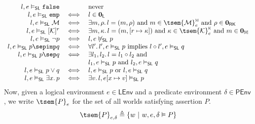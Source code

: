 \[
\begin{array}{r c l}
	l, e \vDash_\mathsf{SL} \mathtt{false}
	&&
	\text{never}
\\
	l, e \vDash_\mathsf{SL}  \mathtt{emp}
	&
	\iff
	&
	l \in \mathbf{0}_\mathsf{L}
\\
	l, e \vDash_\mathsf{SL} \mathcal{M}
	&
	\iff
	&
	\exists m, \rho \ldotp l = (m, \rho) \text{ and } m \in \tsem{\mathcal{M}}_e^\textsc{m} \text{ and } \rho \in \mathbf{0}_\mathsf{RK}
\\
	l, e \vDash_\mathsf{SL} [\mathcal{K}]^r
	&
	\iff
	&
	\exists m, \kappa \ldotp l = (m, [r \mapsto \kappa]) \text{ and } \kappa \in \tsem{\mathcal{K}}_e^\textsc{k} \text{ and } m \in \mathbf{0}_\mathbb{M}
\\
	l, e \vDash_\mathsf{SL} \lnot p
	&
	\iff
	&
	l, e \not\vDash_\mathsf{SL} p
\\
	l, e \vDash_\mathsf{SL} p \sepimp q
	&
	\iff
	&
	\forall l' \ldotp l', e \vDash_\mathsf{SL} p \text{ implies } l \circ l', e \vDash_\mathsf{SL} q
\\
	l, e \vDash_\mathsf{SL} p \sep q
	&
	\iff
	&
	\exists l_1, l_2 \ldotp l = l_1 \circ l_2 \text{ and } \\
	&& l_1, e \vDash_\mathsf{SL} p \text{ and } l_2, e \vDash_\mathsf{SL} q
\\
	 l, e \vDash_\mathsf{SL} p \lor q
	 &
	 \iff
	 &
	 l, e \vDash_\mathsf{SL} p \text{ or } l, e \vDash_\mathsf{SL} q
\\
	l, e \vDash_\mathsf{SL} \exists x \ldotp p
	&
	\iff
	&
	\exists v \ldotp l, e[x \mapsto v] \vDash_\mathsf{SL} p
\end{array}
\]
\endgroup
Now, given a logical environment $e \in \mathsf{LEnv}$ and a predicate environment $\delta \in \mathsf{PEnv}$, we write $\tsem{P}_e$ for the set of all worlds satisfying assertion $P$.
\[
	\tsem{P}_{e, \delta} \triangleq \{ w\ |\ w, e, \delta \vDash P \}
\]